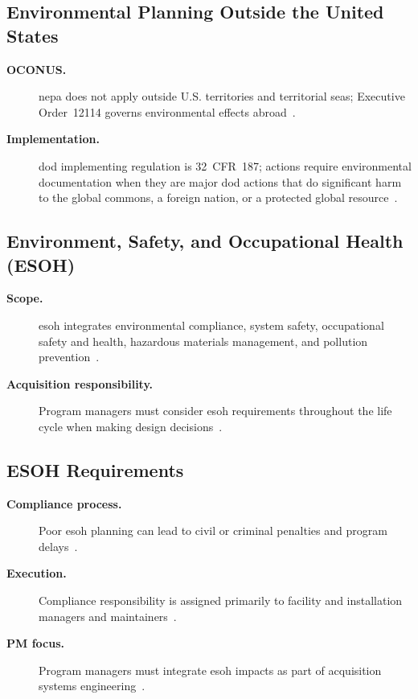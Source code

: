 \documentclass[../main.tex]{subfiles}
\begin{document}
\subsection{Environmental Planning Outside the United States}
\begin{description}
  \item[\textbf{OCONUS.}] \ac{nepa} does not apply outside U.S. territories and territorial seas; Executive Order~12114 governs environmental effects abroad~\autocite{edo-3-3-7-environmental-requirements-2025}.
  \item[\textbf{Implementation.}] \ac{dod} implementing regulation is 32~CFR~187; actions require environmental documentation when they are major \ac{dod} actions that do significant harm to the global commons, a foreign nation, or a protected global resource~\autocite{CFR-32-187,edo-3-3-7-environmental-requirements-2025}.
\end{description}

\subsection{Environment, Safety, and Occupational Health (ESOH)}
\begin{description}
  \item[\textbf{Scope.}] \ac{esoh} integrates environmental compliance, system safety, occupational safety and health, hazardous materials management, and pollution prevention~\autocite{edo-3-3-7-environmental-requirements-2025}.
  \item[\textbf{Acquisition responsibility.}] Program managers must consider \ac{esoh} requirements throughout the life cycle when making design decisions~\autocite{edo-3-3-7-environmental-requirements-2025}.
\end{description}

\subsection{ESOH Requirements}
\begin{description}
  \item[\textbf{Compliance process.}] Poor \ac{esoh} planning can lead to civil or criminal penalties and program delays~\autocite{edo-3-3-7-environmental-requirements-2025}.
  \item[\textbf{Execution.}] Compliance responsibility is assigned primarily to facility and installation managers and maintainers~\autocite{edo-3-3-7-environmental-requirements-2025}.
  \item[\textbf{PM focus.}] Program managers must integrate \ac{esoh} impacts as part of acquisition systems engineering~\autocite{edo-3-3-7-environmental-requirements-2025}.
\end{description}
\end{document}
